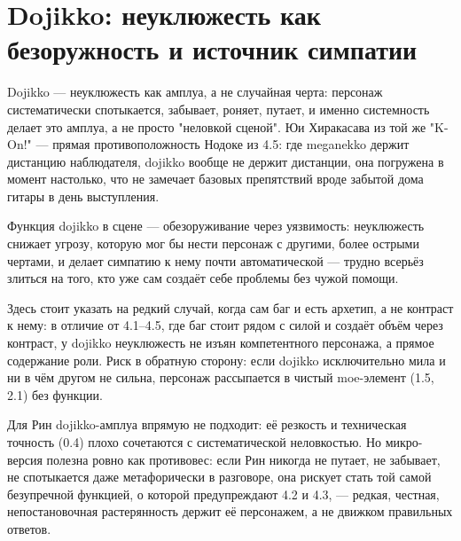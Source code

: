 \section{Dojikko: неуклюжесть как безоружность и источник симпатии}

Dojikko — неуклюжесть как амплуа, а не случайная черта: персонаж систематически спотыкается, забывает, роняет, путает, и именно системность делает это амплуа, а не просто "неловкой сценой". Юи Хиракасава из той же "K-On!" — прямая противоположность Нодоке из 4.5: где meganekko держит дистанцию наблюдателя, dojikko вообще не держит дистанции, она погружена в момент настолько, что не замечает базовых препятствий вроде забытой дома гитары в день выступления.

Функция dojikko в сцене — обезоруживание через уязвимость: неуклюжесть снижает угрозу, которую мог бы нести персонаж с другими, более острыми чертами, и делает симпатию к нему почти автоматической — трудно всерьёз злиться на того, кто уже сам создаёт себе проблемы без чужой помощи.

Здесь стоит указать на редкий случай, когда сам баг и есть архетип, а не контраст к нему: в отличие от 4.1--4.5, где баг стоит рядом с силой и создаёт объём через контраст, у dojikko неуклюжесть не изъян компетентного персонажа, а прямое содержание роли. Риск в обратную сторону: если dojikko исключительно мила и ни в чём другом не сильна, персонаж рассыпается в чистый moe-элемент (1.5, 2.1) без функции.

Для Рин dojikko-амплуа впрямую не подходит: её резкость и техническая точность (0.4) плохо сочетаются с систематической неловкостью. Но микро-версия полезна ровно как противовес: если Рин никогда не путает, не забывает, не спотыкается даже метафорически в разговоре, она рискует стать той самой безупречной функцией, о которой предупреждают 4.2 и 4.3, — редкая, честная, непостановочная растерянность держит её персонажем, а не движком правильных ответов.
